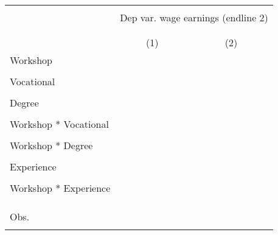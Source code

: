 
\begin{tabular*}{\textwidth}{@{\extracolsep{\fill}}lcc}
\hline
\mbox{} \\ 
& \multicolumn{2}{c}{Dep var. wage earnings (endline 2)} \\
\mbox{} \\ 
\hline
\mbox{} \\ 
& \multicolumn{1}{c}{(1)\mbox{\ }} &        \multicolumn{1}{c}{(2)\mbox{\ }}    \\
\noalign{\smallskip}\hline \noalign{\smallskip}
 Workshop &  &           \\
               &  &       \\
 Vocational &  &        \\
               &  &      \\
 Degree &  &    \\
               &  &       \\
 Workshop * Vocational &  &     \\
               &  &       \\
 Workshop * Degree &  &         \\
               &  &      \\
 Experience &  &       \\
               &  &      \\
 Workshop * Experience &  &    \\
               &  &   \\
 \mbox{}\\
 \hline
 \mbox{}\\
  Obs.                 &  &    \\
\mbox{}\\
\hline
\end{tabular*}%